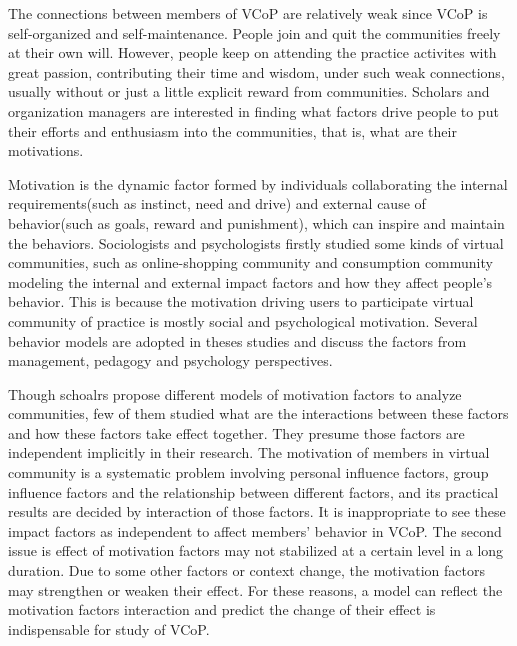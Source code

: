 \documentclass[doublespacing]{elsarticle}
\begin{document}
The connections between members of  VCoP are relatively weak since VCoP is
self-organized and self-maintenance. People join and quit the
communities freely at their own will. However, people keep on
attending the practice activites with great passion, contributing
their time and wisdom, under such weak
connections, usually without or just a little explicit reward from communities. Scholars and
organization managers are interested in finding what  factors drive
people to put their efforts and enthusiasm into the communities,
that is, what are their motivations.

Motivation is the dynamic factor formed by individuals collaborating the internal requirements(such as instinct, need and drive) and external cause of behavior(such as goals, reward and punishment), which can inspire and maintain the behaviors.
Sociologists and psychologists firstly studied some kinds of virtual
communities, such as online-shopping community and consumption community
modeling the internal and external impact factors and how they affect
people's behavior\cite{teo1999iae}\cite{shang2005evi}. This is because
the motivation  driving users to participate virtual community of
practice is mostly social and  psychological  motivation. Several
behavior  models
are adopted in theses studies and discuss the factors from management,
pedagogy and psychology perspectives\cite{Hsiu-FenLin04012007}\cite{bul-125-6-62719991101}\cite{Kuowiley2008}\cite{1631336620050301}\cite{Beecham2008}.

Though schoalrs propose different models of   motivation  factors to analyze communities, few of them studied
what are the interactions between these factors and how these factors
take effect together. They presume those factors are independent
implicitly in their research. The motivation of members in virtual community is
a systematic problem involving personal influence factors, group
influence factors and the relationship between different factors, and
its practical results are decided by interaction of those factors. It
is inappropriate to see these
impact factors  as independent to affect members'
behavior in VCoP. The second issue is  effect of motivation factors
may not stabilized  at a certain level in a
long duration. Due to some other factors or context change, the
motivation factors may strengthen or weaken their effect.  For these
reasons, a model can
reflect   the motivation factors interaction and
predict the change of their effect is indispensable for study of
VCoP. 
\end{document}
